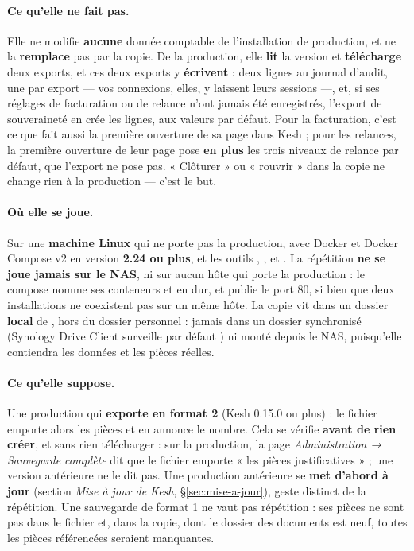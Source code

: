 \documentclass[a4paper,11pt,oneside]{article}
\begin{document}
\paragraph{Ce qu'elle ne fait pas.} Elle ne modifie \textbf{aucune} donnée comptable de l'installation de production, et ne la \textbf{remplace} pas par la copie. De la production, elle \textbf{lit} la version et \textbf{télécharge} deux exports, et ces deux exports y \textbf{écrivent} : deux lignes au journal d'audit, une par export --- vos connexions, elles, y laissent leurs sessions ---, et, si ses réglages de facturation ou de relance n'ont jamais été enregistrés, l'export de souveraineté en crée les lignes, aux valeurs par défaut. Pour la facturation, c'est ce que fait aussi la première ouverture de sa page dans Kesh ; pour les relances, la première ouverture de leur page pose \textbf{en plus} les trois niveaux de relance par défaut, que l'export ne pose pas. « Clôturer » ou « rouvrir » dans la copie ne change rien à la production --- c'est le but.

\paragraph{Où elle se joue.} Sur une \textbf{machine Linux} qui ne porte pas la production, avec Docker et Docker Compose v2 en version \textbf{2.24 ou plus}, et les outils , ,  et . La répétition \textbf{ne se joue jamais sur le NAS}, ni sur aucun hôte qui porte la production : le compose nomme ses conteneurs  et  en dur, et publie le port 80, si bien que deux installations ne coexistent pas sur un même hôte. La copie vit dans un dossier \textbf{local} de , hors du dossier personnel : jamais dans un dossier synchronisé (Synology Drive Client surveille par défaut ) ni monté depuis le NAS, puisqu'elle contiendra les données et les pièces réelles.

\paragraph{Ce qu'elle suppose.} Une production qui \textbf{exporte en format 2} (Kesh 0.15.0 ou plus) : le fichier  emporte alors les pièces et en annonce le nombre. Cela se vérifie \textbf{avant de rien créer}, et sans rien télécharger : sur la production, la page \emph{Administration → Sauvegarde complète} dit que le fichier emporte « les pièces justificatives » ; une version antérieure ne le dit pas. Une production antérieure se \textbf{met d'abord à jour} (section \emph{Mise à jour de Kesh}, \S\ref{sec:mise-a-jour}), geste distinct de la répétition. Une sauvegarde de format 1 ne vaut pas répétition : ses pièces ne sont pas dans le fichier et, dans la copie, dont le dossier des documents est neuf, toutes les pièces référencées seraient manquantes.
\end{document}
